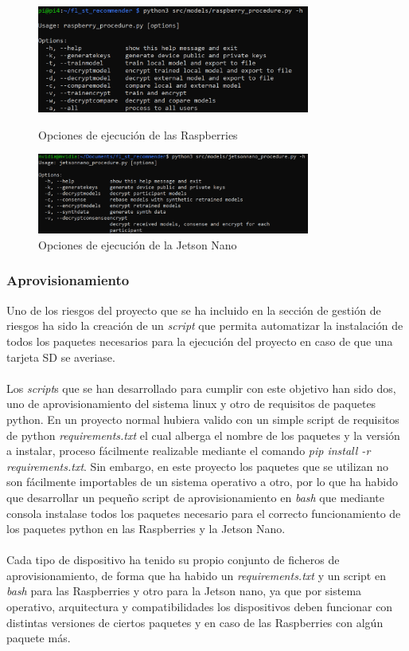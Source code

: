 \begin{figure}[H]
    \centering
    \includegraphics[width=0.8\textwidth]{Figuras/Raspberry_procedure_h.png}
    \caption{Opciones de ejecución de las Raspberries} 

    \includegraphics[width=0.8\textwidth]{Figuras/jetsonnano_procedure_h.png}
    \caption{Opciones de ejecución de la Jetson Nano} 
\end{figure}


\subsubsection{Aprovisionamiento}
Uno de los riesgos del proyecto que se ha incluido en la sección de gestión de riesgos ha sido la creación de un \textit{script} que permita automatizar la instalación de todos los paquetes necesarios para la ejecución del proyecto en caso de que una tarjeta SD se averiase.
\\ \\
Los \textit{script}s que se han desarrollado para cumplir con este objetivo han sido dos, uno de aprovisionamiento del sistema linux y otro de requisitos de paquetes python. En un proyecto normal hubiera valido con un simple script de requisitos de python \textit{requirements.txt} el cual alberga el nombre de los paquetes y la versión a instalar, proceso fácilmente realizable mediante el comando \textit{pip install -r requirements.txt}. Sin embargo, en este proyecto los paquetes que se utilizan no son fácilmente importables de un sistema operativo a otro, por lo que ha habido que desarrollar un pequeño script de aprovisionamiento en \textit{bash} que mediante consola instalase todos los paquetes necesario para el correcto funcionamiento de los paquetes python en las Raspberries y la Jetson Nano.
\\ \\
Cada tipo de dispositivo ha tenido su propio conjunto de ficheros de aprovisionamiento, de forma que ha habido un \textit{requirements.txt} y un script en \textit{bash} para las Raspberries y otro para la Jetson nano, ya que por sistema operativo, arquitectura y compatibilidades los dispositivos deben funcionar con distintas versiones de ciertos paquetes y en caso de las Raspberries con algún paquete más.


